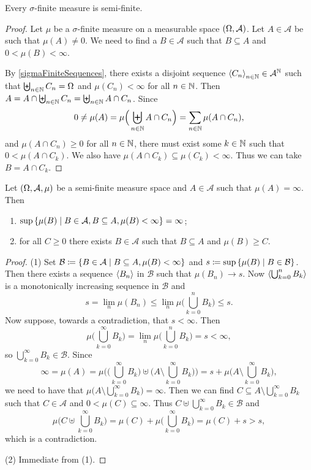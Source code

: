 \begin{lemma}
Every $\sigma$-finite measure is semi-finite.
\end{lemma}
\begin{proof}
Let $\mu$ be a $\sigma$-finite measure on a measurable space $\sSet{\Omega,\mathcal{A}}$. Let $A\in\mathcal{A}$ be such that $\mu(A) \neq 0$. We need to find a $B\in \mathcal{A}$ such that $B\subseteq A$ and $0<\mu(B)<\infty$.

By \ref{sigmaFiniteSequences}, there exists a disjoint sequence $\left\langle C_n \right\rangle_{n\in \mathbb{N}}\in\mathcal{A}^{\mathbb{N}}$ such that $\biguplus_{n\in\mathbb{N}}C_n = \Omega$ and $\mu(C_n) < \infty$ for all $n\in\mathbb{N}$. Then $A = A\cap \biguplus_{n\in\mathbb{N}}C_n = \biguplus_{n\in \mathbb{N}}A\cap C_n$. Since
\[ 0\neq \mu(A) = \mu\Big(\biguplus_{n\in \mathbb{N}}A\cap C_n\Big) = \sum_{n\in\mathbb{N}}\mu(A\cap C_n), \]
and $\mu(A\cap C_n) \geq 0$ for all $n\in \mathbb{N}$, there must exist some $k\in \mathbb{N}$ such that $0< \mu(A\cap C_k)$. We also have $\mu(A\cap C_k) \subseteq \mu(C_k) < \infty$. Thus we can take $B = A\cap C_k$. 
\end{proof}

\begin{lemma}
Let $\sSet{\Omega, \mathcal{A}, \mu}$ be a semi-finite measure space and $A\in\mathcal{A}$ such that $\mu(A) = \infty$. Then
\begin{enumerate}
\item $\sup\setbuilder{\mu(B)}{B\in \mathcal{A}, B\subseteq A, \mu(B)<\infty} = \infty$;
\item for all $C\geq 0$ there exists $B\in \mathcal{A}$ such that $B\subseteq A$ and $\mu(B) \geq C$.
\end{enumerate} 
\end{lemma}
\begin{proof}
(1) Set $\mathcal{B} \defeq \setbuilder{B\in \mathcal{A}}{B\subseteq A, \mu(B)<\infty}$ and $s \defeq \sup\setbuilder{\mu(B)}{B\in \mathcal{B}}$. Then there exists a sequence $\left\langle B_n \right\rangle$ in $\mathcal{B}$ such that $\mu(B_n) \to s$. Now $\left\langle \bigcup_{k=0}^n B_k \right\rangle$ is a monotonically increasing sequence in $\mathcal{B}$ and
\[ s = \lim_n \mu(B_n) \leq \lim_n \mu\Big(\bigcup_{k=0}^n B_k\Big) \leq s. \]
Now suppose, towards a contradiction, that $s < \infty$. Then
\[ \mu\Big(\bigcup_{k=0}^\infty B_k\Big) = \lim_n \mu\Big(\bigcup_{k=0}^n B_k\Big) = s <\infty, \]
so $\bigcup_{k=0}^\infty B_k\in \mathcal{B}$. Since
\[ \infty = \mu(A) = \mu\bigg(\Big(\bigcup_{k=0}^\infty B_k\Big)\uplus \Big(A\setminus \bigcup_{k=0}^\infty B_k\Big)\bigg) = s + \mu\Big(A\setminus\bigcup_{k=0}^\infty B_k\Big), \]
we need to have that $\mu\Big(A\setminus\bigcup_{k=0}^\infty B_k\Big) = \infty$. Then we can find $C \subseteq A\setminus\bigcup_{k=0}^\infty B_k$ such that $C\in\mathcal{A}$ and $0<\mu(C)\subseteq \infty$. Thus $C\uplus \bigcup_{k=0}^\infty B_k \in \mathcal{B}$ and
\[ \mu\Big(C\uplus \bigcup_{k=0}^\infty B_k\Big) = \mu(C) + \mu\Big(\bigcup_{k=0}^\infty B_k\Big) = \mu(C) + s > s, \]
which is a contradiction.

(2) Immediate from (1).
\end{proof}


